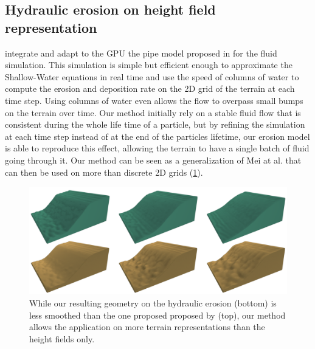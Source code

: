 \subsection{Hydraulic erosion on height field representation}
\citep{Mei2007} integrate and adapt to the GPU the pipe model proposed in \cite{OBrien1995} for the fluid simulation. This simulation is simple but efficient enough to approximate the Shallow-Water equations in real time and use the speed of columns of water to compute the erosion and deposition rate on the 2D grid of the terrain at each time step. Using columns of water even allows the flow to overpass small bumps on the terrain over time. Our method initially rely on a stable fluid flow that is consistent during the whole life time of a particle, but by refining the simulation at each time step instead of at the end of the particles lifetime, our erosion model is able to reproduce this effect, allowing the terrain to have a single batch of fluid going through it. Our method can be seen as a generalization of Mei at al. that can then be used on more than discrete 2D grids (\cref{fig:erosion_screen-mei2007-1}). 

\begin{figure}[ht]
    \centering
    \includegraphics[width= 1\linewidth]{otherPapersRepro/hydro.pdf}
    \caption{While our resulting geometry on the hydraulic erosion (bottom) is less smoothed than the one proposed proposed by \cite{Mei2007} (top), our method allows the application on more terrain representations than the height fields only.}
    \label{fig:erosion_screen-mei2007-1}
\end{figure}

